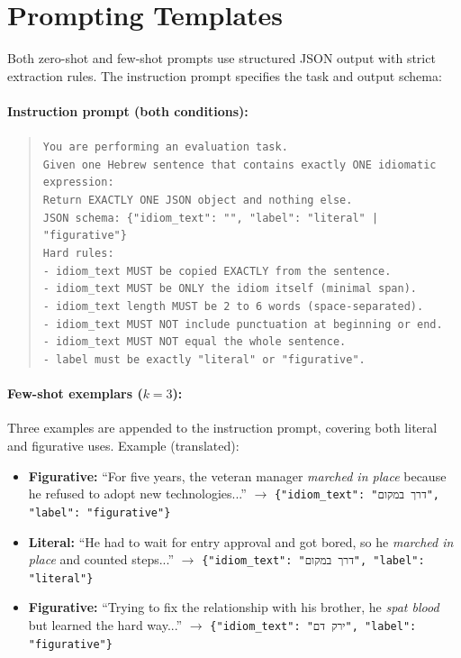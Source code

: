 \documentclass[11pt]{article}
\begin{document}
\section{Prompting Templates}
\label{sec:appendix_prompts}

Both zero-shot and few-shot prompts use structured JSON output with strict extraction rules. The instruction prompt specifies the task and output schema:

\paragraph{Instruction prompt (both conditions):}
\begin{quote}
\small
\texttt{You are performing an evaluation task.}\\[0.5em]
\texttt{Given one Hebrew sentence that contains exactly ONE idiomatic expression:}\\[0.5em]
\texttt{Return EXACTLY ONE JSON object and nothing else.}\\[0.5em]
\texttt{JSON schema: \{"idiom\_text": "", "label": "literal" | "figurative"\}}\\[0.5em]
\texttt{Hard rules:}\\
\texttt{- idiom\_text MUST be copied EXACTLY from the sentence.}\\
\texttt{- idiom\_text MUST be ONLY the idiom itself (minimal span).}\\
\texttt{- idiom\_text length MUST be 2 to 6 words (space-separated).}\\
\texttt{- idiom\_text MUST NOT include punctuation at beginning or end.}\\
\texttt{- idiom\_text MUST NOT equal the whole sentence.}\\
\texttt{- label must be exactly "literal" or "figurative".}
\end{quote}

\paragraph{Few-shot exemplars ($k=3$):}
Three examples are appended to the instruction prompt, covering both literal and figurative uses. Example (translated):
\begin{itemize}
    \item \textbf{Figurative:} ``For five years, the veteran manager \textit{marched in place} because he refused to adopt new technologies...'' $\rightarrow$ \texttt{\{"idiom\_text": "דרך במקום", "label": "figurative"\}}
    \item \textbf{Literal:} ``He had to wait for entry approval and got bored, so he \textit{marched in place} and counted steps...'' $\rightarrow$ \texttt{\{"idiom\_text": "דרך במקום", "label": "literal"\}}
    \item \textbf{Figurative:} ``Trying to fix the relationship with his brother, he \textit{spat blood} but learned the hard way...'' $\rightarrow$ \texttt{\{"idiom\_text": "ירק דם", "label": "figurative"\}}
\end{itemize}
\end{document}
